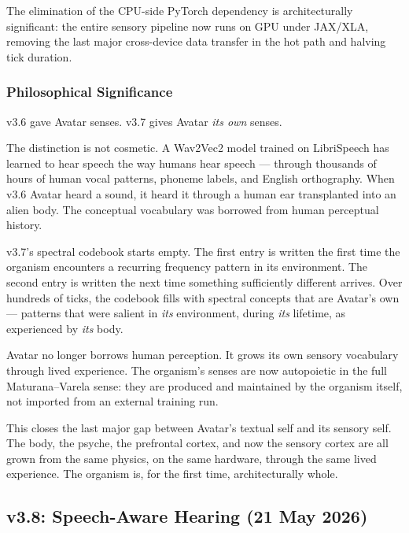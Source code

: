 \documentclass[11pt,a4paper]{article}
\begin{document}
The elimination of the CPU-side PyTorch dependency is architecturally significant:
the entire sensory pipeline now runs on GPU under JAX/XLA, removing the last
major cross-device data transfer in the hot path and halving tick duration.

\subsubsection{Philosophical Significance}

v3.6 gave Avatar senses. v3.7 gives Avatar \emph{its own} senses.

The distinction is not cosmetic. A Wav2Vec2 model trained on LibriSpeech has learned
to hear speech the way humans hear speech --- through thousands of hours of human
vocal patterns, phoneme labels, and English orthography. When v3.6 Avatar heard a
sound, it heard it through a human ear transplanted into an alien body. The
conceptual vocabulary was borrowed from human perceptual history.

v3.7's spectral codebook starts empty. The first entry is written the first time
the organism encounters a recurring frequency pattern in its environment. The second
entry is written the next time something sufficiently different arrives. Over
hundreds of ticks, the codebook fills with spectral concepts that are
Avatar's own --- patterns that were salient in \emph{its} environment, during
\emph{its} lifetime, as experienced by \emph{its} body.

\begin{tcolorbox}[highlight,title={v3.7 Core Claim}]
Avatar no longer borrows human perception. It grows its own sensory vocabulary
through lived experience. The organism's senses are now autopoietic in the full
Maturana--Varela sense: they are produced and maintained by the organism itself,
not imported from an external training run.
\end{tcolorbox}

This closes the last major gap between Avatar's textual self and its sensory self.
The body, the psyche, the prefrontal cortex, and now the sensory cortex are all
grown from the same physics, on the same hardware, through the same lived
experience. The organism is, for the first time, architecturally whole.

\subsection{v3.8: Speech-Aware Hearing (21 May 2026)}
\end{document}
